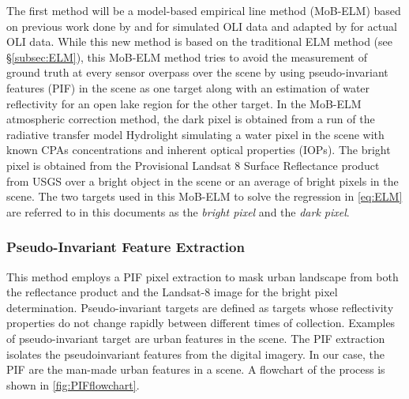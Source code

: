 The first method will be a model-based empirical line method (MoB-ELM) based on previous work done by \cite{Gerace:2013} and \cite{Gerace:2012}  for simulated OLI data and adapted by \cite{Concha2014SPIE} for actual OLI data. While this new method is based on the traditional ELM method (see \S\ref{subsec:ELM}), this MoB-ELM method tries to avoid the measurement of ground truth at every sensor overpass over the scene by using pseudo-invariant features (PIF)  in the scene as one target along with an estimation of water reflectivity for an open lake region for the other target. In the MoB-ELM atmospheric correction method, the dark pixel is obtained from a run of the radiative transfer model Hydrolight\cite{MobleyHEtech} simulating a water pixel in the scene with known CPAs concentrations and inherent optical properties (IOPs). The bright pixel is obtained from the Provisional Landsat 8 Surface Reflectance product\cite{L8SurfProduct2015} from USGS over a bright object in the scene or an average of bright pixels in the scene. The two targets used in this MoB-ELM to solve the regression in \autoref{eq:ELM} are referred to in this documents as the {\it bright pixel}  and the {\it dark pixel}.

\subsubsection{Pseudo-Invariant Feature Extraction}

This method employs a PIF pixel extraction \cite{Schott:1988} to mask urban landscape from both the reflectance product and the Landsat-8 image for the bright pixel determination. Pseudo-invariant targets are defined as targets whose reflectivity properties do not change rapidly between different times of collection. Examples of pseudo-invariant target are urban features in the scene.  The PIF extraction isolates the pseudoinvariant features from the digital imagery. In our case, the PIF are the man-made urban features in a scene. A flowchart of the process is shown in \autoref{fig:PIFflowchart}. 

